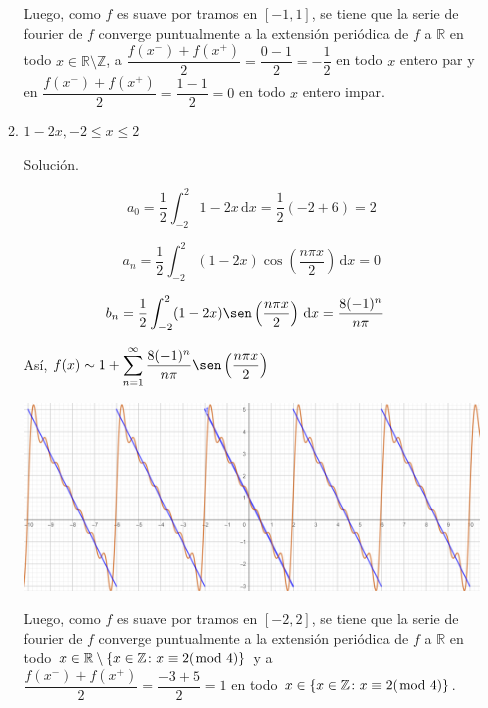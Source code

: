 \documentclass[fleqn]{article}
\newcommand{\real}{\mathbb{R}}
\newcommand{\ent}{\mathbb{Z}}
\newcommand{\intg}[3]{\int_{#1}^{#2} #3 \, \mathrm{d}x}
\begin{document}
\begin{enumerate}[I.]
\begin{enumerate}[(1)]
			Luego, como $f$ es suave por tramos en $ [-1,1] $, se tiene que la serie de fourier de $f$ converge puntualmente a la extensión periódica de $f$ a $ \real $ en todo $ x \in \real \setminus \ent $, a $ \dfrac{f(x^-) + f(x^+)}{2} = \dfrac{0-1}{2} = -\dfrac{1}{2} $ en todo $ x $ entero par y en $ \dfrac{f(x^-) + f(x^+)}{2} = \dfrac{1-1}{2} = 0 $ en todo $ x $ entero impar.

			\bfseries
			\item $ 1 - 2x, -2 \leq x \leq 2 $
			
			Solución.

			\normalfont

			\begin{equation*}
				a_0 = \dfrac{1}{2} \intg{-2}{2}{1 - 2x} = \dfrac{1}{2} (-2 + 6) = 2
			\end{equation*}

			\begin{equation*}
				a_n = \dfrac{1}{2} \intg{-2}{2}{(1 - 2x) \cos \left( \dfrac{n \pi x}{2} \right)} = 0
			\end{equation*}

			\begin{align*}
				b_n &= \dfrac{1}{2} \intg{-2}{2}{(1 - 2x) \sen \left( \dfrac{n \pi x}{2} \right)} = \dfrac{8(-1)^n}{n \pi}
			\end{align*}

			Así, $ \displaystyle f(x) \sim 1 + \sum_{n=1}^{\infty} \dfrac{8(-1)^n}{n \pi} \sen \left( \dfrac{n \pi x}{2} \right) $

			\includegraphics[width=\linewidth]{Ejer3.png}

			Luego, como $f$ es suave por tramos en $ [-2,2] $, se tiene que la serie de fourier de $f$ converge puntualmente a la extensión periódica de $f$ a $ \real $ en todo $ x \in \real \setminus \{ x \in \ent \colon x \equiv 2 (\hspace{-2mm} \mod 4) \} $ y a $ \dfrac{f(x^-) + f(x^+)}{2} = \dfrac{-3+5}{2} = 1 $ en todo $ x \in \{ x \in \ent \colon x \equiv 2 (\hspace{-2mm} \mod 4) \} $.


\end{enumerate}
\end{enumerate}
\end{document}
